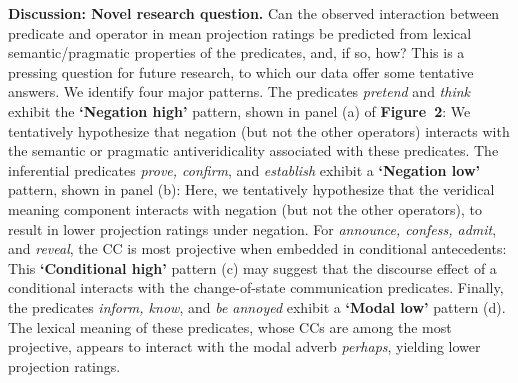 \documentclass[12pt, letterpaper]{article}
\begin{document}
\noindent
{\bf Discussion: Novel research question.}
	Can the observed interaction between predicate and operator in mean projection ratings be predicted from lexical semantic/pragmatic properties of the predicates, and, if so, how?
	This is a pressing question for future research, to which our data offer some tentative answers. We identify four major patterns.
	The predicates \emph{pretend} and \emph{think} exhibit the {\bf `Negation high'} pattern, shown in panel (a) of \textbf{Figure~2}: We tentatively hypothesize that negation (but not the other operators) interacts with the semantic or pragmatic antiveridicality associated with these predicates.
	The inferential predicates \emph{prove, confirm}, and \emph{establish} exhibit a {\bf `Negation low'} pattern, shown in panel (b): Here, we tentatively hypothesize that the veridical meaning component interacts with negation (but not the other operators), to result in lower projection ratings under negation.
	For \emph{announce, confess, admit}, and \emph{reveal}, the CC is most projective when embedded in conditional antecedents: This {\bf `Conditional high'} pattern (c) may suggest that the discourse effect of a conditional interacts with the change-of-state communication predicates.
	Finally, the predicates  \emph{inform, know}, and \emph{be annoyed} exhibit a {\bf `Modal low'} pattern (d). The lexical meaning of these predicates, whose CCs are among the most projective, appears to interact with the modal adverb {\em perhaps}, yielding lower projection ratings.


\end{document}
